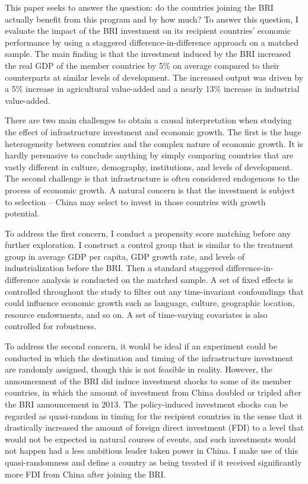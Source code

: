 \documentclass[10pt,a4paper]{article}
\begin{document}
This paper seeks to answer the question: do the countries joining the
BRI actually benefit from this program and by how much? To answer this
question, I evaluate the impact of the BRI investment on its recipient
countries' economic performance by using a staggered
difference-in-difference approach on a matched sample. The main finding
is that the investment induced by the BRI increased the real GDP of the
member countries by 5\% on average compared to their counterparts at
similar levels of development. The increased output was driven by a 5\%
increase in agricultural value-added and a nearly 13\% increase in
industrial value-added.~

There are two main challenges to obtain a causal interpretation when
studying the effect of infrastructure investment and economic growth.
The first is the huge heterogeneity between countries and the complex
nature of economic growth. It is hardly persuasive to conclude anything
by simply comparing countries that are vastly different in culture,
demography, institutions, and levels of development. The second
challenge is that infrastructure is often considered endogenous to the
process of economic growth. A natural concern is that the investment is
subject to selection -- China may select to invest in those countries
with growth potential.~

To address the first concern, I conduct a propensity score matching
before any further exploration. I construct a control group that is
similar to the treatment group in average GDP per capita, GDP growth
rate, and levels of industrialization before the BRI. Then a standard
staggered difference-in-difference analysis is conducted on the matched
sample. A set of fixed effects is controlled throughout the study to
filter out any time-invariant confoundings that could influence economic
growth such as language, culture, geographic location, resource
endowments, and so on. A set of time-varying covariates is also
controlled for robustness.~

To address the second concern, it would be ideal if an experiment could
be conducted in which the destination and timing of the infrastructure
investment are randomly assigned, though this is not feasible in
reality. However, the announcement of the BRI did induce investment
shocks to some of its member countries, in which the amount of
investment from China doubled or tripled after the BRI announcement in
2013. The policy-induced investment shocks can be regarded as
quasi-random in timing for the recipient countries in the sense that it
drastically increased the amount of foreign direct investment (FDI) to a
level that would not be expected in natural courses of events, and such
investments would not happen had a less ambitious leader taken power in
China. I make use of this quasi-randomness and define a country as being
treated if it received significantly more FDI from China after joining
the BRI.~
\end{document}
